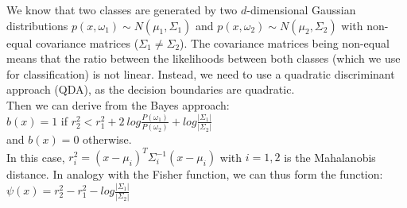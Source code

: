 \documentclass{article}
\begin{document}
We know that two classes are generated by two $d$-dimensional Gaussian distributions $p(x, \omega_1 ) \sim N (\mu_1 , \Sigma_1 )$ and $p(x, \omega_2 ) \sim N (\mu_2 , \Sigma_2 )$ with non-equal covariance matrices ($\Sigma_1 \neq \Sigma_2$).
The covariance matrices being non-equal means that the ratio between the likelihoods between both classes (which we use for classification) is not linear. Instead, we need to use a quadratic discriminant approach (QDA), as the decision boundaries are quadratic. \\ 

Then we can derive from the Bayes approach: \\ 
$b(x) = 1$ if $r_2^2 < r_1^2 + 2\ log \frac{P (\omega_1)}{P(\omega_2)} + log \frac{|\Sigma_1|}{|\Sigma_2|}$ \\
and $b(x) = 0$ otherwise. \\

In this case, $r_i^2 = (x − \mu_i )^T \Sigma_i^{−1} (x − \mu_i )$ with $i = 1, 2$ is the Mahalanobis distance. 
In analogy with the Fisher function, we can thus form the function: \\
$\psi (x) = r_2^2 - r_1^2 - log \frac{|\Sigma_1|}{|\Sigma_2|}$
\end{document}
